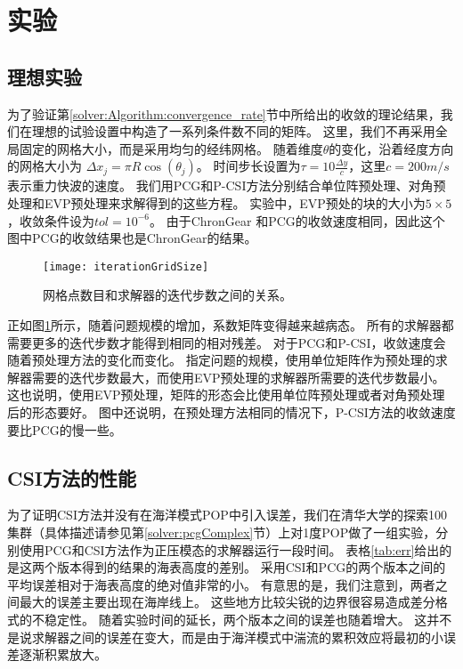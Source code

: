 \section{实验} 
\label{solver:exp}
 
\subsection{理想实验}\label{solver:exp:ideal}

为了验证第\ref{solver:Algorithm:convergence_rate}节中所给出的收敛的理论结果，我们在理想的试验设置中构造了一系列条件数不同的矩阵。
这里，我们不再采用全局固定的网格大小，而是采用均匀的经纬网格。
随着维度$\theta$的变化，沿着经度方向的网格大小为 $\Delta x_j  = \pi R \cos (\theta_j)$。
时间步长设置为$\tau = 10\frac{\Delta y}{c}$，这里$c = 200m/s$ 表示重力快波的速度\cite{smith2010parallel}。 
我们用PCG和P-CSI方法分别结合单位阵预处理、对角预处理和EVP预处理来求解得到的这些方程。
实验中，EVP预处的块的大小为$5\times5$，收敛条件设为$tol = 10^{-6}$。 
由于ChronGear 和PCG的收敛速度相同，因此这个图中PCG的收敛结果也是ChronGear的结果。
  

\begin{figure} 
\vspace{5pt}
\centering
\texttt{[image: iterationGridSize]}
\caption[] {网格点数目和求解器的迭代步数之间的关系。\label{fig:iterationGridSize}}
\end{figure}

正如图\ref{fig:iterationGridSize}所示，随着问题规模的增加，系数矩阵变得越来越病态。
所有的求解器都需要更多的迭代步数才能得到相同的相对残差。
对于PCG和P-CSI，收敛速度会随着预处理方法的变化而变化。 
指定问题的规模，使用单位矩阵作为预处理的求解器需要的迭代步数最大，而使用EVP预处理的求解器所需要的迭代步数最小。 
这也说明，使用EVP预处理，矩阵的形态会比使用单位阵预处理或者对角预处理后的形态要好。 
图中还说明，在预处理方法相同的情况下，P-CSI方法的收敛速度要比PCG的慢一些。 



 
\subsection{CSI方法的性能}
 



 
为了证明CSI方法并没有在海洋模式POP中引入误差，我们在清华大学的探索100集群（具体描述请参见第\ref{solver:pcgComplex}节）上对1度POP做了一组实验，分别使用PCG和CSI方法作为正压模态的求解器运行一段时间。 
表格\ref{tab:err}给出的是这两个版本得到的结果的海表高度的差别。
采用CSI和PCG的两个版本之间的平均误差相对于海表高度的绝对值非常的小。
有意思的是，我们注意到，两者之间最大的误差主要出现在海岸线上。 这些地方比较尖锐的边界很容易造成差分格式的不稳定性。
随着实验时间的延长，两个版本之间的误差也随着增大。 这并不是说求解器之间的误差在变大，而是由于海洋模式中湍流的累积效应将最初的小误差逐渐积累放大。 

